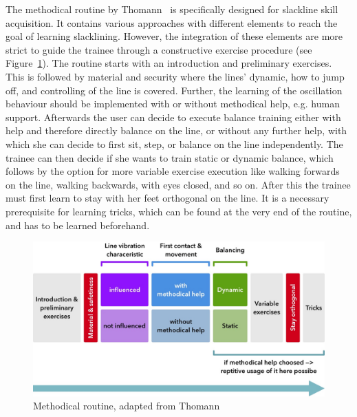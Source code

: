The methodical routine by Thomann~\cite{Thomann2013-aa} is specifically designed for slackline skill acquisition. It contains various approaches with different elements to reach the goal of learning slacklining. However, the integration of these elements are more strict to guide the trainee through a constructive exercise procedure (see Figure~\ref{fig:3_3_1_methodicalRoutine}). The routine starts with an introduction and preliminary exercises. This is followed by material and security where the lines' dynamic, how to jump off, and controlling of the line is covered. Further, the learning of the oscillation behaviour should be implemented with or without methodical help, e.g. human support. Afterwards the user can decide to execute balance training either with help and therefore directly balance on the line, or without any further help, with which she can decide to first sit, step, or balance on the line independently.
The trainee can then decide if she wants to train static or dynamic balance, which follows by the option for more variable exercise execution like walking forwards on the line, walking backwards, with eyes closed, and so on. After this the trainee must first learn to stay with her feet orthogonal on the line. It is a necessary prerequisite for learning tricks, which can be found at the very end of the routine, and has to be learned beforehand.
\begin{figure}[htb]
	\centering
	\begin{minipage}[t]{1\linewidth}
		\centering
		\includegraphics[width=0.91\linewidth]{Pictures/3_3_1_methodicalRoutine3}
		\caption{Methodical routine, adapted from Thomann~\cite{Thomann2013-aa}}
		\label{fig:3_3_1_methodicalRoutine}
	\end{minipage}
\end{figure}

